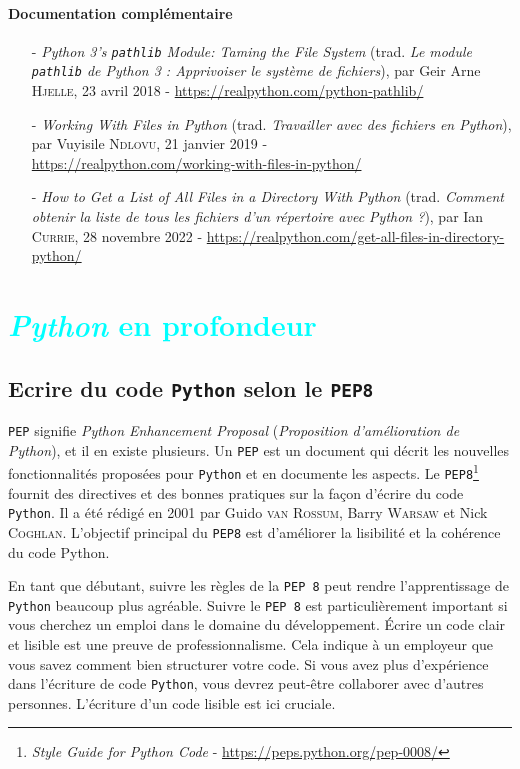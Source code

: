 \documentclass[a4paper,12pt]{book}
\begin{document}
\subsection*{Documentation complémentaire}
\begin{itemize}
	\item[-] \textit{Python 3's \texttt{pathlib} Module: Taming the File System} (trad. \textit{Le module \texttt{pathlib} de Python 3 : Apprivoiser le système de fichiers}), par Geir Arne \textsc{Hjelle}, 23 avril 2018 - \url{https://realpython.com/python-pathlib/}
	\item[-] \textit{Working With Files in Python} (trad. \textit{Travailler avec des fichiers en Python}), par Vuyisile \textsc{Ndlovu}, 21 janvier 2019 - \\ \url{https://realpython.com/working-with-files-in-python/}
	\item[-] \textit{How to Get a List of All Files in a Directory With Python} (trad. \textit{Comment obtenir la liste de tous les fichiers d'un répertoire avec Python ?}), par Ian \textsc{Currie}, 28 novembre 2022 - \url{https://realpython.com/get-all-files-in-directory-python/}
\end{itemize}


\part{\textcolor{cyan}{\textit{Python} en profondeur}}

\chapter{Ecrire du code \texttt{Python} selon le \texttt{PEP8}}
\texttt{PEP} signifie \textit{Python Enhancement Proposal} (\textit{Proposition d'amélioration de Python}), et il en existe plusieurs. Un \texttt{PEP} est un document qui décrit les nouvelles fonctionnalités proposées pour \texttt{Python} et en documente les aspects. Le \texttt{PEP8}\footnote{\textit{Style Guide for Python Code} - \url{https://peps.python.org/pep-0008/}} fournit des directives et des bonnes pratiques sur la façon d'écrire du code \texttt{Python}. Il a été rédigé en 2001 par Guido \textsc{van Rossum}, Barry \textsc{Warsaw} et Nick \textsc{Coghlan}. L'objectif principal du \texttt{PEP8} est d'améliorer la lisibilité et la cohérence du code Python.
\medskip

En tant que débutant, suivre les règles de la \texttt{PEP 8} peut rendre l'apprentissage de \texttt{Python} beaucoup plus agréable. Suivre le \texttt{PEP 8} est particulièrement important si vous cherchez un emploi dans le domaine du développement. Écrire un code clair et lisible est une preuve de professionnalisme. Cela indique à un employeur que vous savez comment bien structurer votre code. Si vous avez plus d'expérience dans l'écriture de code \texttt{Python}, vous devrez peut-être collaborer avec d'autres personnes. L'écriture d'un code lisible est ici cruciale. 
\end{document}
